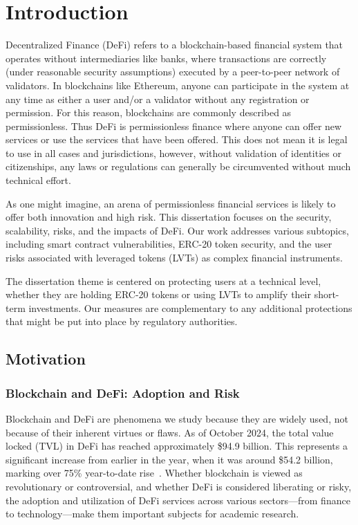 
\chapter{Introduction}

Decentralized Finance (DeFi) refers to a blockchain-based financial system that operates without intermediaries like banks, where transactions are correctly (under reasonable security assumptions) executed by a peer-to-peer network of validators. In blockchains like Ethereum, anyone can participate in the system at any time as either a user and/or a validator without any registration or permission. For this reason, blockchains are commonly described as permissionless. Thus DeFi is permissionless finance where anyone can offer new services or use the services that have been offered. This does not mean it is legal to use in all cases and jurisdictions, however, without validation of identities or citizenships, any laws or regulations can generally be circumvented without much technical effort.

As one might imagine, an arena of permissionless financial services is likely to offer both innovation and high risk. This dissertation focuses on the security, scalability, risks, and the impacts of DeFi. Our work addresses various subtopics, including smart contract vulnerabilities, ERC-20 token security, and the user risks associated with leveraged tokens (LVTs) as complex financial instruments. 

The dissertation theme is centered on protecting users at a technical level, whether they are holding ERC-20 tokens or using LVTs to amplify their short-term investments. Our measures are complementary to any additional protections that might be put into place by regulatory authorities. 

\section{Motivation}
\subsection{Blockchain and DeFi: Adoption and Risk}
Blockchain and DeFi are phenomena we study because they are widely used, not because of their inherent virtues or flaws. As of October 2024, the total value locked (TVL) in DeFi has reached approximately \$94.9 billion. This represents a significant increase from earlier in the year, when it was around \$54.2 billion, marking over 75\% year-to-date rise~\cite{coingecko2024,binance2024}. Whether blockchain is viewed as revolutionary or controversial, and whether DeFi is considered liberating or risky, the adoption and utilization of DeFi services across various sectors—from finance to technology—make them important subjects for academic research. 

